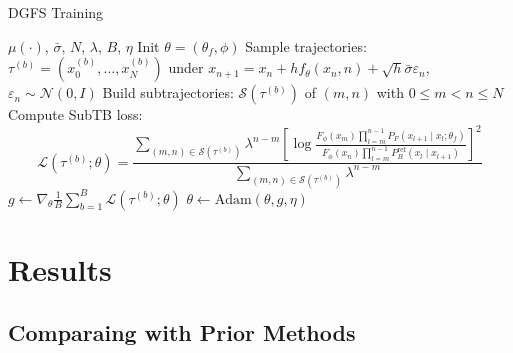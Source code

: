 \documentclass[aspectratio=169,xcolor=dvipsnames]{beamer}
\begin{document}
\begin{frame}[t,fragile]{}
\footnotesize  

\vspace{-0.35cm}

\begin{algorithm}[H]
    \footnotesize
\caption{DGFS Training}
\label{alg:dgfs}
\begin{algorithmic}[1]
\Require $\mu(\cdot)$, $\bar{\sigma}$, $N$, $\lambda$, $B$, $\eta$
\State Init $\theta=(\theta_f,\phi)$
\Repeat
    \State Sample trajectories:
        \State $\tau^{(b)}=(x^{(b)}_0,\ldots,x^{(b)}_N)$ under $x_{n+1}=x_n+h f_{\theta}(x_n,n)+\sqrt{h}\bar{\sigma}\varepsilon_n$, $\varepsilon_n\sim\mathcal N(0,I)$
    \EndFor
    \State Build subtrajectories: $\mathcal S(\tau^{(b)})$ of $(m,n)$ with $0\le m<n\le N$
    \State Compute SubTB loss:
    \begin{equation*}
\mathcal L(\tau^{(b)};\theta)=\frac{\sum_{(m,n)\in\mathcal S(\tau^{(b)})}\lambda^{n-m}\left[\log\frac{F_\phi(x_m)\prod_{l=m}^{n-1} P_F(x_{l+1}\mid x_l;\theta_f)}{F_\phi(x_n)\prod_{l=m}^{n-1} P_B^{\mathrm{ref}}(x_l\mid x_{l+1})}\right]^2}{\sum_{(m,n)\in\mathcal S(\tau^{(b)})}\lambda^{n-m}}
    \end{equation*}
    \State $g \leftarrow \nabla_{\theta}\frac{1}{B}\sum_{b=1}^B \mathcal L(\tau^{(b)};\theta)$
    \State $\theta \leftarrow \mathrm{Adam}(\theta, g, \eta)$
\end{algorithmic}
\end{algorithm}
\end{frame}


\section{Results}

\subsection{Comparaing with Prior Methods}
\end{document}
